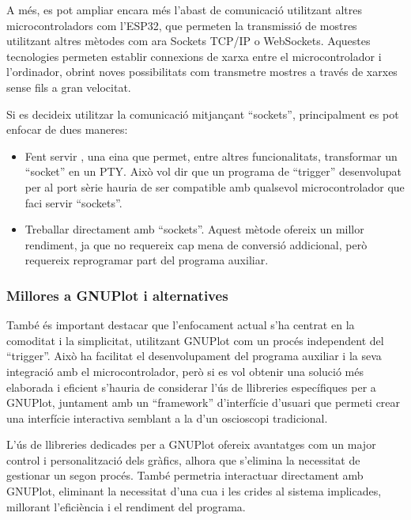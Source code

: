 \documentclass{tfgitic}[2023/06/30]
\begin{document}
A més, es pot ampliar encara més l'abast de comunicació utilitzant
altres microcontroladors com l'ESP32, que permeten la transmissió de
mostres utilitzant altres mètodes com ara Sockets TCP/IP o
WebSockets. Aquestes tecnologies permeten establir connexions de xarxa
entre el microcontrolador i l'ordinador, obrint noves possibilitats
com transmetre mostres a través de xarxes sense fils a gran velocitat.

Si es decideix utilitzar la comunicació mitjançant ``sockets'',
principalment es pot enfocar de dues maneres:

\begin{itemize}
	\item Fent servir \cite[socat]{socat}, una eina que permet,
          entre altres funcionalitats, transformar un ``socket'' en un
          PTY. Això vol dir que un programa de ``trigger''
          desenvolupat per al port sèrie hauria de ser compatible amb
          qualsevol microcontrolador que faci servir ``sockets''.
	\item Treballar directament amb ``sockets''. Aquest mètode
          ofereix un millor rendiment, ja que no requereix cap mena de
          conversió addicional, però requereix reprogramar part del
          programa auxiliar.
\end{itemize}

\newpage

\subsubsection{Millores a GNUPlot i alternatives}

També és important destacar que l'enfocament actual s'ha centrat en la
comoditat i la simplicitat, utilitzant GNUPlot com un procés
independent del ``trigger''. Això ha facilitat el desenvolupament del
programa auxiliar i la seva integració amb el microcontrolador, però
si es vol obtenir una solució més elaborada i eficient s'hauria de
considerar l'ús de llibreries específiques per a GNUPlot, juntament
amb un ``framework'' d'interfície d'usuari que permeti crear una
interfície interactiva semblant a la d'un osci\lgem oscopi
tradicional.

L'ús de llibreries dedicades per a GNUPlot ofereix avantatges com un
major control i personalització dels gràfics, alhora que s'elimina la
necessitat de gestionar un segon procés. També permetria interactuar
directament amb GNUPlot, eliminant la necessitat d'una cua i les
crides al sistema implicades, millorant l'eficiència i el rendiment
del programa.
\end{document}
